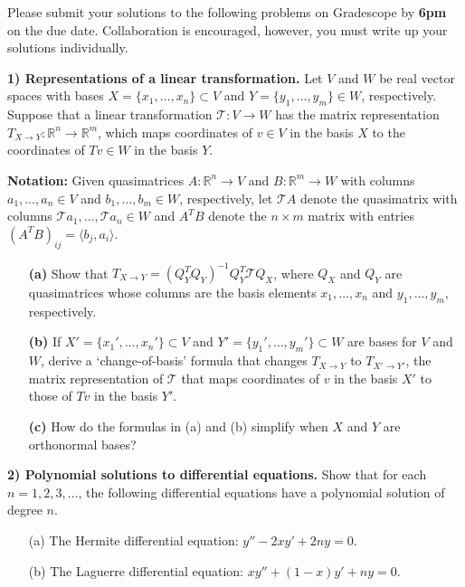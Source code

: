 \documentclass[12pt]{article}
\begin{document}
\noindent
Please submit your solutions to the following problems on Gradescope by \textbf{6pm} on the due date. Collaboration is encouraged, however, you must write up your solutions individually.

\bigskip

\noindent
\textbf{1) Representations of a linear transformation.} Let $V$ and $W$ be real vector spaces with bases $X=\{x_1,\ldots,x_n\}\subset V$ and $Y=\{y_1,\ldots,y_m\}\in W$, respectively. Suppose that a linear transformation $\mathcal{T}:V\rightarrow W$ has the matrix representation $T_{X\rightarrow Y}:\mathbb{R}^n\rightarrow\mathbb{R}^m$, which maps coordinates of $v\in V$ in the basis $X$ to the coordinates of $Tv\in W$ in the basis $Y$.

\medskip
\noindent
\textbf{Notation:} Given quasimatrices $A:\mathbb{R}^n\rightarrow V$ and $B:\mathbb{R}^m\rightarrow W$ with columns $a_1,\ldots,a_n \in V$ and $b_1,\ldots,b_m \in W$, respectively, let $\mathcal{T}A$ denote the quasimatrix with columns $\mathcal{T}a_1,\ldots,\mathcal{T}a_n\in W$ and $A^TB$ denote the $n\times m$ matrix with entries $(A^TB)_{ij} = \langle b_j, a_i\rangle$.  

\begin{itemize}

	\item[\textbf{(a)}] Show that $T_{X\rightarrow Y} = (Q_Y^T Q_Y)^{-1}Q_Y^T\mathcal{T}Q_X$, where $Q_X$ and $Q_Y$ are quasimatrices whose columns are the basis elements $x_1,\ldots,x_n$ and $y_1,\ldots,y_m$, respectively.

    \item[\textbf{(b)}] If $X'=\{x_1',\ldots,x_n'\}\subset V$ and $Y'=\{y_1',\ldots,y_m'\}\subset W$ are bases for $V$ and $W$, derive a `change-of-basis' formula that changes $T_{X\rightarrow Y}$ to $T_{X'\rightarrow Y'}$, the matrix representation of $\mathcal{T}$ that maps coordinates of $v$ in the basis $X'$ to those of $Tv$ in the basis $Y'$.

    \item[\textbf{(c)}] How do the formulas in (a) and (b) simplify when $X$ and $Y$ are orthonormal bases?

\end{itemize}

\bigskip
\noindent
\textbf{2) Polynomial solutions to differential equations.} Show that for each $n=1,2,3,\ldots$, the following differential equations have a polynomial solution of degree $n$.

\begin{itemize}
\item[(a)] The Hermite differential equation: $y''-2xy'+2ny=0$.

\item[(b)] The Laguerre differential equation: $xy''+(1-x)y'+ny=0$.

\end{itemize}
\end{document}
